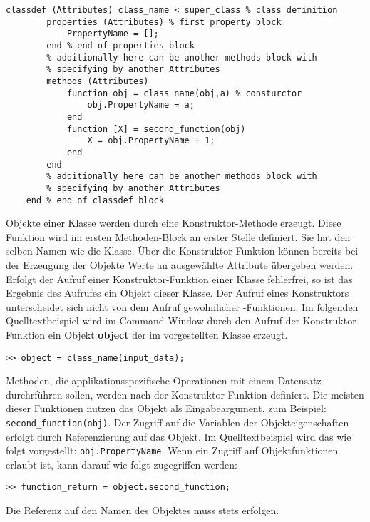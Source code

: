 \begin{lstlisting}[float=h!,caption={Beispiel Klassendefinition},label={Klassendefinition}, frame=none]
	classdef (Attributes) class_name < super_class % class definition
		properties (Attributes) % first property block
			PropertyName = [];
		end % end of properties block
		% additionally here can be another methods block with 
		% specifying by another Attributes
		methods (Attributes) 
			function obj = class_name(obj,a) % consturctor
				obj.PropertyName = a;
			end
			function [X] = second_function(obj)
				X = obj.PropertyName + 1;
			end
		end
		% additionally here can be another methods block with 
		% specifying by another Attributes
	end % end of classdef block
\end{lstlisting}

Objekte einer Klasse werden durch eine Konstruktor-Methode erzeugt. Diese
Funktion wird im ersten Methoden-Block an erster Stelle definiert. Sie hat den
selben Namen wie die Klasse. \"Uber die Konstruktor-Funktion k\"onnen bereits
bei der Erzeugung der Objekte Werte an ausgew\"ahlte Attribute \"ubergeben
werden. Erfolgt der Aufruf einer Konstruktor-Funktion einer Klasse fehlerfrei,
so ist das Ergebnis des Aufrufes ein Objekt dieser Klasse. Der Aufruf eines
Konstruktors unterscheidet sich nicht von dem Aufruf gew\"ohnlicher
\matlab-Funktionen. Im folgenden Quelltextbeispiel wird im Command-Window durch
den Aufruf der Konstruktor-Funktion ein Objekt \textbf{object} der im
 vorgestellten Klasse erzeugt.
\begin{lstlisting}[frame=none]
	>> object = class_name(input_data);
\end{lstlisting}

Methoden, die applikationsspezifische Operationen mit einem Datensatz
durchrf\"uhren sollen, werden nach der Konstruktor-Funktion definiert.  Die
meisten dieser Funktionen nutzen das Objekt als Eingabeargument, zum Beispiel:
\lstinline{second_function(obj)}. Der Zugriff auf die Variablen der
Objekteigenschaften erfolgt durch Referenzierung auf das Objekt. Im
Quelltextbeispiel  wird das wie folgt vorgestellt:
\lstinline{obj.PropertyName}. Wenn ein Zugriff auf Objektfunktionen erlaubt ist,
kann darauf wie folgt zugegriffen werden:

\begin{lstlisting}[frame=none]
	>> function_return = object.second_function;
\end{lstlisting}
\noindent Die Referenz auf den Namen des Objektes muss stets erfolgen.

